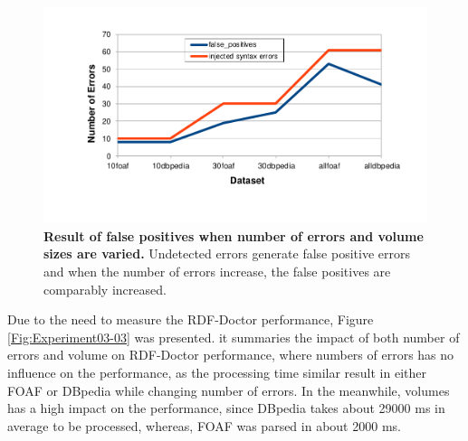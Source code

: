 \begin{figure}[ht]
\begin{center}
		\includegraphics[scale=0.8,angle=0]{images/Experiment03-02.pdf}
		\setlength\belowcaptionskip{-5mm}
		\setlength\abovecaptionskip{-10mm}
		\caption{\textbf{Result of false positives when number of errors and volume sizes are varied.} Undetected errors generate false positive errors and when the number of errors increase, the false positives are comparably increased.}
				\label{Fig:Experiment03-02}
\end{center}
\end{figure}

Due to the need to measure the RDF-Doctor performance, Figure \ref{Fig:Experiment03-03} was presented. it summaries the impact of both number of errors and volume on RDF-Doctor performance, where numbers of errors has no influence on the performance, as the processing time similar result in either FOAF or DBpedia while changing number of errors. In the meanwhile, volumes has a high impact on the performance, since  DBpedia  takes about 29000 ms in average to be processed, whereas, FOAF was parsed in about 2000 ms.   

